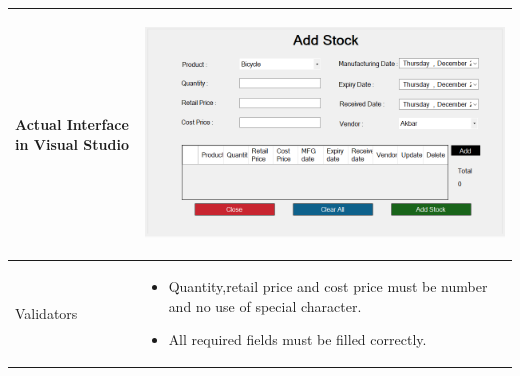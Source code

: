 \documentclass[12pt,a4paper]{article}
\begin{document}
\begin{longtable}{| p{3cm}|p{12cm}|}
Actual Interface in Visual Studio  & \begin{center} \includegraphics[scale=0.3]{./User Interface1/UI-029Add Stock.png}\end{center}  \\ \hline

Validators & 
\begin{itemize}
\item   Quantity,retail price and cost price must be number and no use of special character. 
\item All required fields must be filled correctly. 
\end{itemize}
\\ \hline
\end{longtable}
\end{document}
